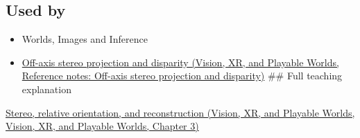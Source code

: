 \subsection{Used by}\label{appendix-c4e98b6e4001-used-by}

\begin{itemize}
\item
  {Worlds, Images and Inference}
\item
  \href{../07-Vision-XR-and-Playable-Worlds/main.pdf\#nameddest=appendix-0976e86e5b9f}{Off-axis stereo projection and disparity (Vision, XR, and Playable Worlds, Reference notes: Off-axis stereo projection and disparity)} \#\# Full teaching explanation
\end{itemize}

\href{../07-Vision-XR-and-Playable-Worlds/main.pdf\#nameddest=04-visual-computing-ii-ch032-stereo-relative-orientation-and-reconstruction}{Stereo, relative orientation, and reconstruction (Vision, XR, and Playable Worlds, Vision, XR, and Playable Worlds, Chapter 3)}
